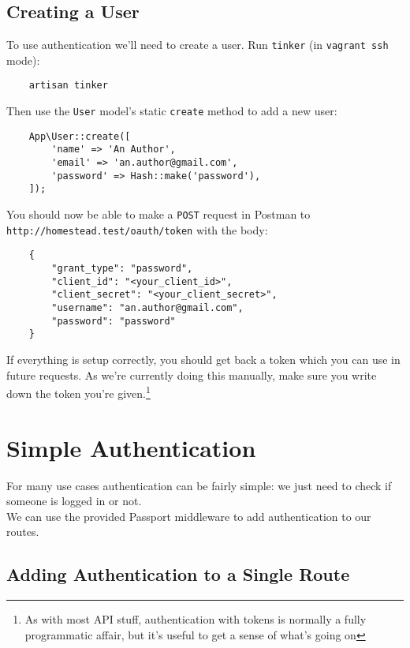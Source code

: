 \pagebreak

\subsection{Creating a User}

To use authentication we'll need to create a user. Run \texttt{tinker} (in \texttt{vagrant ssh} mode):

\begin{verbatim}
    artisan tinker
\end{verbatim}

Then use the \texttt{User} model's static \texttt{create} method to add a new user:

\begin{verbatim}
    App\User::create([
        'name' => 'An Author',
        'email' => 'an.author@gmail.com',
        'password' => Hash::make('password'),
    ]);
\end{verbatim}

You should now be able to make a \texttt{POST} request in Postman to \\ \texttt{http://homestead.test/oauth/token} with the body:

\begin{verbatim}
    {
        "grant_type": "password",
        "client_id": "<your_client_id>",
        "client_secret": "<your_client_secret>",
        "username": "an.author@gmail.com",
        "password": "password"
    }
\end{verbatim}

If everything is setup correctly, you should get back a token which you can use in future requests. As we're currently doing this manually, make sure you write down the token you're given.\footnote{As with most API stuff, authentication with tokens is normally a fully programmatic affair, but it's useful to get a sense of what's going on}


\pagebreak


\section{Simple Authentication}

For many use cases authentication can be fairly simple: we just need to check if someone is logged in or not.
\\

We can use the provided Passport middleware to add authentication to our routes.


\subsection{Adding Authentication to a Single Route}

